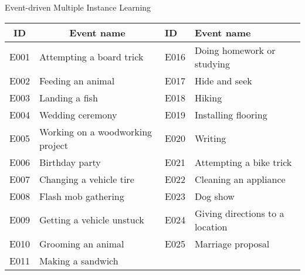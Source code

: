
\begin{frame}{Event-driven Multiple Instance Learning} 	
\begin{table}[h]
	\tiny
	\renewcommand{\arraystretch}{0.5}
	\begin{tabular}{@{}clll@{}}
		\toprule
		\textbf{ID} & \multicolumn{1}{c}{\textbf{Event name}} & \textbf{ID} & \textbf{Event name} \\ \midrule
		\multicolumn{1}{|c|}{E001} & \multicolumn{1}{l|}{Attempting a board trick} & \multicolumn{1}{l|}{E016} & \multicolumn{1}{l|}{Doing homework or studying} \\ \midrule
		\multicolumn{1}{|c|}{E002} & \multicolumn{1}{l|}{Feeding an animal} & \multicolumn{1}{l|}{E017} & \multicolumn{1}{l|}{Hide and seek} \\ \midrule
		\multicolumn{1}{|c|}{E003} & \multicolumn{1}{l|}{Landing a fish} & \multicolumn{1}{l|}{E018} & \multicolumn{1}{l|}{Hiking} \\ \midrule
		\multicolumn{1}{|c|}{E004} & \multicolumn{1}{l|}{Wedding ceremony} & \multicolumn{1}{l|}{E019} & \multicolumn{1}{l|}{Installing flooring} \\ \midrule
		\multicolumn{1}{|c|}{E005} & \multicolumn{1}{l|}{Working on a woodworking project} & \multicolumn{1}{l|}{E020} & \multicolumn{1}{l|}{Writing} \\ \midrule
		\multicolumn{1}{|c|}{E006} & \multicolumn{1}{l|}{Birthday party} & \multicolumn{1}{l|}{E021} & \multicolumn{1}{l|}{Attempting a bike trick} \\ \midrule
		\multicolumn{1}{|c|}{E007} & \multicolumn{1}{l|}{Changing a vehicle tire} & \multicolumn{1}{l|}{E022} & \multicolumn{1}{l|}{Cleaning an appliance} \\ \midrule
		\multicolumn{1}{|c|}{E008} & \multicolumn{1}{l|}{Flash mob gathering} & \multicolumn{1}{l|}{E023} & \multicolumn{1}{l|}{Dog show} \\ \midrule
		\multicolumn{1}{|c|}{E009} & \multicolumn{1}{l|}{Getting a vehicle unstuck} & \multicolumn{1}{l|}{E024} & \multicolumn{1}{l|}{Giving directions to a location} \\ \midrule
		\multicolumn{1}{|c|}{E010} & \multicolumn{1}{l|}{Grooming an animal} & \multicolumn{1}{l|}{E025} & \multicolumn{1}{l|}{Marriage proposal} \\ \midrule
		\multicolumn{1}{|l|}{E011} & \multicolumn{1}{l|}{Making a sandwich} & \multicolumn{1}{l|}{} & \multicolumn{1}{l|}{} \\ \midrule

\end{tabular}
\end{table}
\end{frame}
